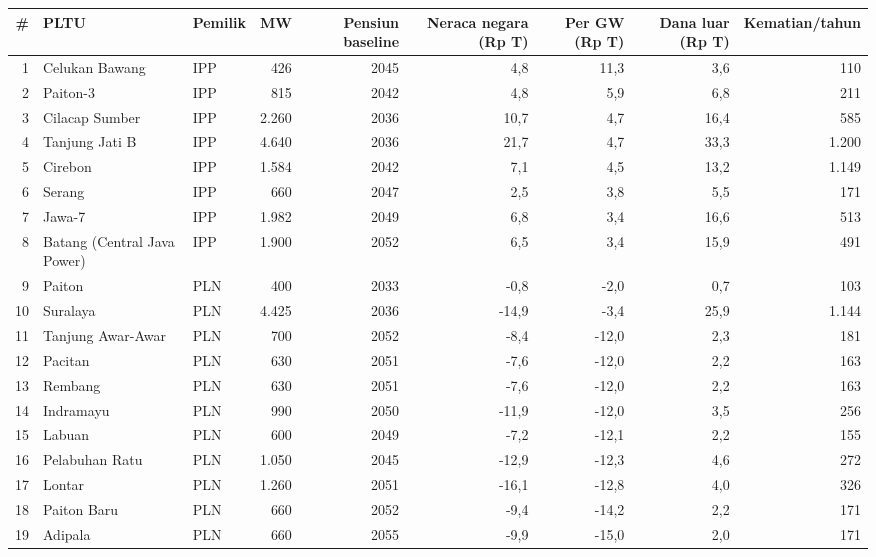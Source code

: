 \begin{tabular}{rllrrrrrr}
\toprule
\# & PLTU & Pemilik & MW & Pensiun baseline & Neraca negara (Rp T) & Per GW (Rp T) & Dana luar (Rp T) & Kematian/tahun \\
\midrule
1 & Celukan Bawang & IPP & 426 & 2045 & 4,8 & 11,3 & 3,6 & 110 \\
2 & Paiton-3 & IPP & 815 & 2042 & 4,8 & 5,9 & 6,8 & 211 \\
3 & Cilacap Sumber & IPP & 2.260 & 2036 & 10,7 & 4,7 & 16,4 & 585 \\
4 & Tanjung Jati B & IPP & 4.640 & 2036 & 21,7 & 4,7 & 33,3 & 1.200 \\
5 & Cirebon & IPP & 1.584 & 2042 & 7,1 & 4,5 & 13,2 & 1.149 \\
6 & Serang & IPP & 660 & 2047 & 2,5 & 3,8 & 5,5 & 171 \\
7 & Jawa-7 & IPP & 1.982 & 2049 & 6,8 & 3,4 & 16,6 & 513 \\
8 & Batang (Central Java Power) & IPP & 1.900 & 2052 & 6,5 & 3,4 & 15,9 & 491 \\
9 & Paiton & PLN & 400 & 2033 & -0,8 & -2,0 & 0,7 & 103 \\
10 & Suralaya & PLN & 4.425 & 2036 & -14,9 & -3,4 & 25,9 & 1.144 \\
11 & Tanjung Awar-Awar & PLN & 700 & 2052 & -8,4 & -12,0 & 2,3 & 181 \\
12 & Pacitan & PLN & 630 & 2051 & -7,6 & -12,0 & 2,2 & 163 \\
13 & Rembang & PLN & 630 & 2051 & -7,6 & -12,0 & 2,2 & 163 \\
14 & Indramayu & PLN & 990 & 2050 & -11,9 & -12,0 & 3,5 & 256 \\
15 & Labuan & PLN & 600 & 2049 & -7,2 & -12,1 & 2,2 & 155 \\
16 & Pelabuhan Ratu & PLN & 1.050 & 2045 & -12,9 & -12,3 & 4,6 & 272 \\
17 & Lontar & PLN & 1.260 & 2051 & -16,1 & -12,8 & 4,0 & 326 \\
18 & Paiton Baru & PLN & 660 & 2052 & -9,4 & -14,2 & 2,2 & 171 \\
19 & Adipala & PLN & 660 & 2055 & -9,9 & -15,0 & 2,0 & 171 \\
\bottomrule
\end{tabular}
